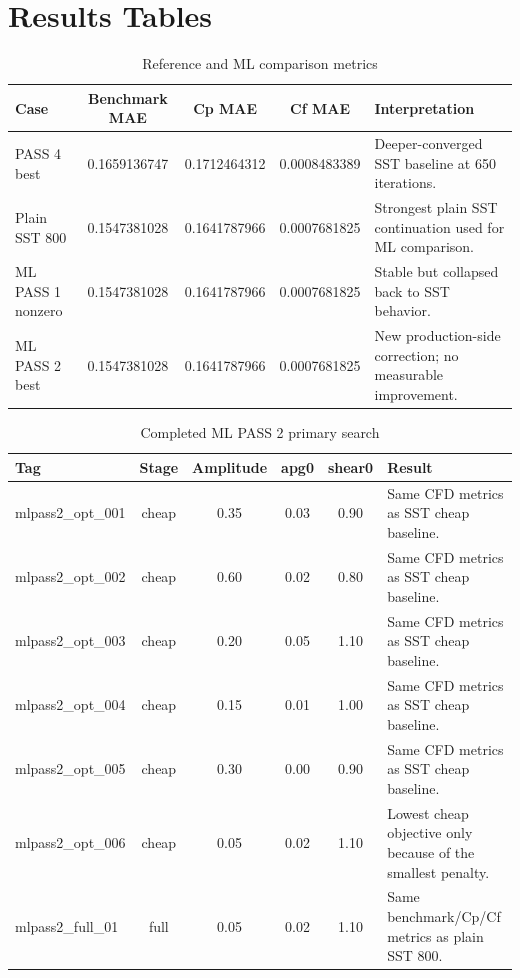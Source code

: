 \documentclass[11pt]{article}
\begin{document}
\section{Results Tables}
\begin{table}[H]
\centering
\caption{Reference and ML comparison metrics}
\begin{tabularx}{\linewidth}{@{}lcccX@{}}
\toprule
Case & Benchmark MAE & Cp MAE & Cf MAE & Interpretation \\
\midrule
PASS 4 best & 0.1659136747 & 0.1712464312 & 0.0008483389 & Deeper-converged SST baseline at 650 iterations. \\
Plain SST 800 & 0.1547381028 & 0.1641787966 & 0.0007681825 & Strongest plain SST continuation used for ML comparison. \\
ML PASS 1 nonzero & 0.1547381028 & 0.1641787966 & 0.0007681825 & Stable but collapsed back to SST behavior. \\
ML PASS 2 best & 0.1547381028 & 0.1641787966 & 0.0007681825 & New production-side correction; no measurable improvement. \\
\bottomrule
\end{tabularx}
\end{table}

\begin{table}[H]
\centering
\caption{Completed ML PASS 2 primary search}
\begin{tabularx}{\linewidth}{@{}lccccX@{}}
\toprule
Tag & Stage & Amplitude & apg0 & shear0 & Result \\
\midrule
mlpass2\_opt\_001 & cheap & 0.35 & 0.03 & 0.90 & Same CFD metrics as SST cheap baseline. \\
mlpass2\_opt\_002 & cheap & 0.60 & 0.02 & 0.80 & Same CFD metrics as SST cheap baseline. \\
mlpass2\_opt\_003 & cheap & 0.20 & 0.05 & 1.10 & Same CFD metrics as SST cheap baseline. \\
mlpass2\_opt\_004 & cheap & 0.15 & 0.01 & 1.00 & Same CFD metrics as SST cheap baseline. \\
mlpass2\_opt\_005 & cheap & 0.30 & 0.00 & 0.90 & Same CFD metrics as SST cheap baseline. \\
mlpass2\_opt\_006 & cheap & 0.05 & 0.02 & 1.10 & Lowest cheap objective only because of the smallest penalty. \\
mlpass2\_full\_01 & full & 0.05 & 0.02 & 1.10 & Same benchmark/Cp/Cf metrics as plain SST 800. \\
\bottomrule
\end{tabularx}
\end{table}
\end{document}
